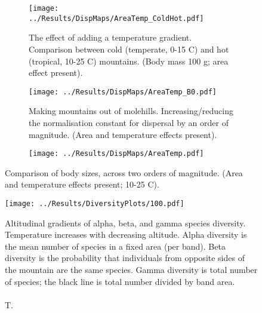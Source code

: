 \documentclass[11pt]{article}
\begin{document}
\newpage
\begin{figure}
\vspace*{-6cm}
\centering

	\begin{subfigure}{\textwidth}
		\texttt{[image: ../Results/DispMaps/AreaTemp\_ColdHot.pdf]}
		\caption{The effect of adding a temperature gradient. Comparison between cold (temperate, 0-15 \degree C) and hot (tropical, 10-25 \degree C) mountains. (Body mass 100 g; area effect present).}
	\end{subfigure}%
	
	\begin{subfigure}{\textwidth}
		\texttt{[image: ../Results/DispMaps/AreaTemp\_B0.pdf]}
		\caption{Making mountains out of molehills. Increasing/reducing the normalisation constant for dispersal by an order of magnitude. (Area and temperature effects present).}
	\end{subfigure}%

	\caption{}

\end{figure}


\newpage
\begin{figure}

	\begin{subfigure}{\textwidth}
		\texttt{[image: ../Results/DispMaps/AreaTemp.pdf]}
		\caption{}
	\end{subfigure}%

	\caption{Comparison of body sizes, across two orders of magnitude. (Area and temperature effects present; 10-25 \degree C).}

\end{figure}







\newpage
\begin{figure}
\vspace*{-7cm}

	\texttt{[image: ../Results/DiversityPlots/100.pdf]}
	\caption{Altitudinal gradients of alpha, beta, and gamma species diversity. Temperature increases with decreasing altitude. Alpha diversity is the mean number of species in a fixed area (per band). Beta diversity is the probability that individuals from opposite sides of the mountain are the same species. Gamma diversity is total number of species; the black line is total number divided by band area.\\\\ T.}

\end{figure}
\end{document}
